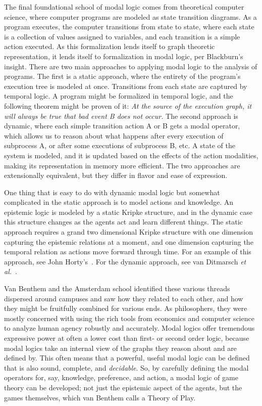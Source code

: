 The final foundational school of modal logic comes from theoretical computer science, where computer programs are modeled as state transition diagrams. As a program executes, the computer transitions from state to state, where each state is a collection of values assigned to variables, and each transition is a simple action executed. As this formalization lends itself to graph theoretic representation, it lends itself to formalization in modal logic, per Blackburn's insight. There are two main approaches to applying modal logic to the analysis of programs. The first is a static approach, where the entirety of the program's execution tree is modeled at once. Transitions from each state are captured by temporal logic. A program might be formalized in temporal logic, and the following theorem might be proven of it: \emph{At the source of the execution graph, it will always be true that bad event B does not occur.} The second approach is dynamic, where each simple transition action A or B gets a modal operator, which allows us to reason about what happens after every execution of subprocess A, or after some executions of subprocess B, etc. A state of the system is modeled, and it is updated based on the effects of the action modalities, making its representation in memory more efficient. The two approaches are extensionally equivalent, but they differ in flavor and ease of expression. 

One thing that is easy to do with dynamic modal logic but somewhat complicated in the static approach is to model actions and knowledge. An epistemic logic is modeled by a static Kripke structure, and in the dynamic case this structure changes as the agents act and learn different things. The static approach requires a grand two dimensional Kripke structure with one dimension capturing the epistemic relations at a moment, and one dimension capturing the temporal relation as actions move forward through time. For an example of this approach, see John Horty's~\cite{Horty}. For the dynamic approach, see van Ditmarsch \emph{et al.}~\cite{DEL}.

Van Benthem and the Amsterdam school identified these various threads dispersed around campuses and saw how they related to each other, and how they might be fruitfully combined for various ends. As philosophers, they were mostly concerned with using the rich tools from economics and computer science to analyze human agency robustly and accurately. Modal logics offer tremendous expressive power at often a lower cost than first- or second order logic, because modal logics take an internal view of the graphs they reason about and are defined by. This often means that a powerful, useful modal logic can be defined that is also sound, complete, and \emph{decidable}. So, by carefully defining the modal operators for, say, knowledge, preference, and action, a modal logic of game theory can be developed; not just the epistemic aspect of the agents, but the games themselves, which van Benthem calls a Theory of Play. 

